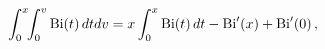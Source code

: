 \[\int_{0}^{x}\!\!\int_{0}^{v}\mathop{\mathrm{Bi}\/}\nolimits\!\left(t\right)%
dtdv=x\int_{0}^{x}\mathop{\mathrm{Bi}\/}\nolimits\!\left(t\right)dt-\mathop{%
\mathrm{Bi}\/}\nolimits'\!\left(x\right)+\mathop{\mathrm{Bi}\/}\nolimits'\!%
\left(0\right),\]
